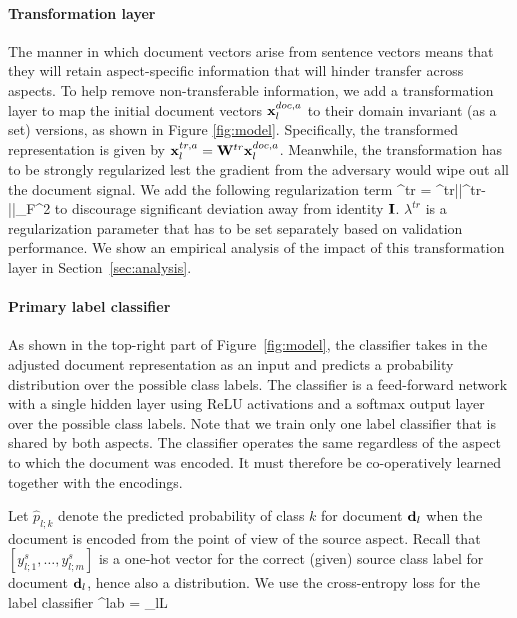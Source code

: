 \paragraph{Transformation layer} The manner in which document vectors arise from sentence vectors means that they will retain aspect-specific information that will hinder transfer across aspects. To help remove non-transferable information, we add a transformation layer to map the initial document vectors $\mathbf{x}^{doc,a}_l$ to their domain invariant (as a set) versions, as shown in Figure \ref{fig:model}. Specifically, the transformed representation is given by $\mathbf{x}^{tr,a}_l=\mathbf{W}^{tr}\mathbf{x}^{doc,a}_l$. Meanwhile, the transformation has to be strongly regularized lest the gradient from the adversary would wipe out all the document signal.  
We add the following regularization term 
\be\label{eq:transformation}
\Omega^{tr} = \lambda^{tr}||^{tr}-||_F^2
\ee
to discourage significant deviation away from identity $\mathbf{I}$. $\lambda^{tr}$ is a regularization parameter that has to be set separately based on validation performance. We show an empirical analysis of the impact of this transformation layer in Section~\ref{sec:analysis}.

\paragraph{Primary label classifier} As shown in the top-right part of Figure~\ref{fig:model}, the classifier takes in the adjusted document representation as an input and predicts a probability distribution over the possible class labels. The classifier is a feed-forward network with a single hidden layer using ReLU activations and a softmax output layer over the possible class labels. 
Note that we train only one label classifier that is shared by both aspects.
The classifier operates the same regardless of the aspect to which the document was encoded. It must therefore be co-operatively learned together with the encodings. 

Let $\hat p_{l;k}$ denote the predicted probability of class $k$ for document $\mathbf{d}_l$ when the document is encoded from the point of view of the source aspect. Recall that $[y^s_{l;1},\ldots,y^s_{l;m}]$ is a one-hot vector for the correct (given) source class label for document $\mathbf{d}_l$, hence also a distribution. We use the cross-entropy loss for the label classifier
\be
{}^{lab} = \sum_{l\in L}\left[
-\sum_{k=1}^m y^s_{l;k} \log\hat{p}_{l;k}
\right] 
\ee

